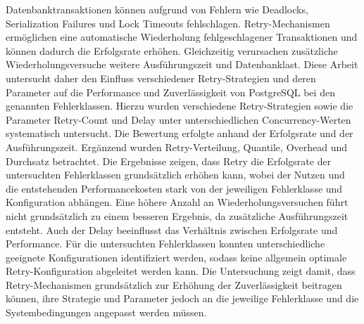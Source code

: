 
Datenbanktransaktionen können aufgrund von Fehlern wie Deadlocks, Serialization Failures und Lock Timeouts fehlschlagen.
Retry-Mechanismen ermöglichen eine automatische Wiederholung fehlgeschlagener Transaktionen und können dadurch die
Erfolgsrate erhöhen.
Gleichzeitig verursachen zusätzliche Wiederholungsversuche weitere Ausführungszeit und Datenbanklast.
Diese Arbeit untersucht daher den Einfluss verschiedener Retry-Strategien und deren Parameter auf die Performance und
Zuverlässigkeit von PostgreSQL bei den genannten Fehlerklassen.
Hierzu wurden verschiedene Retry-Strategien sowie die Parameter Retry-Count und Delay unter unterschiedlichen
Concurrency-Werten systematisch untersucht.
Die Bewertung erfolgte anhand der Erfolgsrate und der Ausführungszeit.
Ergänzend wurden Retry-Verteilung, Quantile, Overhead und Durchsatz betrachtet.
Die Ergebnisse zeigen, dass Retry die Erfolgsrate der untersuchten Fehlerklassen grundsätzlich erhöhen kann,
wobei der Nutzen und die entstehenden Performancekosten stark von der jeweiligen Fehlerklasse und Konfiguration
abhängen.
Eine höhere Anzahl an Wiederholungsversuchen führt nicht grundsätzlich zu einem besseren Ergebnis, da zusätzliche
Ausführungszeit entsteht.
Auch der Delay beeinflusst das Verhältnis zwischen Erfolgsrate und Performance.
Für die untersuchten Fehlerklassen konnten unterschiedliche geeignete Konfigurationen identifiziert werden,
sodass keine allgemein optimale Retry-Konfiguration abgeleitet werden kann.
Die Untersuchung zeigt damit, dass Retry-Mechanismen grundsätzlich zur Erhöhung der Zuverlässigkeit beitragen können,
ihre Strategie und Parameter jedoch an die jeweilige Fehlerklasse und die Systembedingungen angepasst werden müssen.
